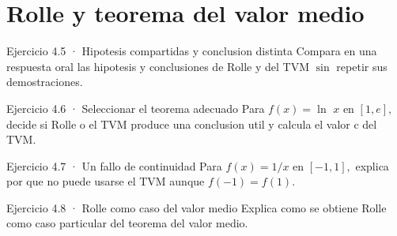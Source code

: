 \documentclass[10pt,a4paper,oneside,openany]{book}
\begin{document}
\section{Rolle y teorema del valor medio}
\begin{PSevenExerciseFixed}{Ejercicio 4.5 · Hipotesis compartidas y conclusion distinta}
Compara en una respuesta oral las hipotesis y conclusiones de Rolle y del TVM \(\sin\) repetir sus demostraciones.
\end{PSevenExerciseFixed}
\begin{PSevenExerciseFixed}{Ejercicio 4.6 · Seleccionar el teorema adecuado}
Para \(f(x)=\ln\) \(x\) en \([1,e],\) decide si Rolle o el TVM produce una conclusion util y calcula el valor c del TVM.
\end{PSevenExerciseFixed}
\begin{PSevenExerciseFixed}{Ejercicio 4.7 · Un fallo de continuidad}
Para \(f(x)=1/x\) en \([-1,1],\) explica por que no puede usarse el TVM aunque \(f(-1)=f(1)\).
\end{PSevenExerciseFixed}
\begin{PSevenExerciseFixed}{Ejercicio 4.8 · Rolle como caso del valor medio}
Explica como se obtiene Rolle como caso particular del teorema del valor medio.
\end{PSevenExerciseFixed}
\end{document}
